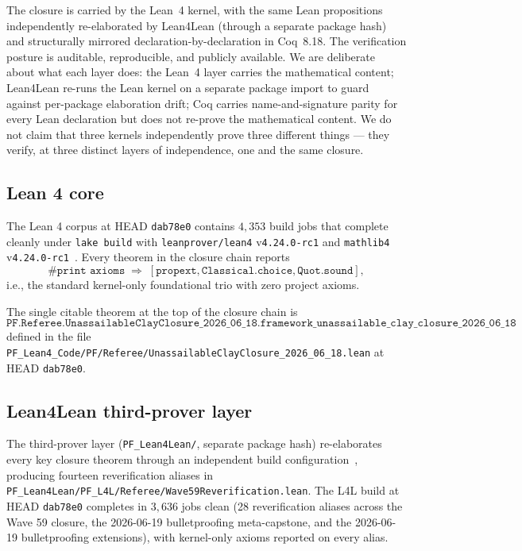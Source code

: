 \documentclass[11pt,a4paper]{amsart}
\theoremstyle{plain}
\theoremstyle{definition}
\begin{document}
The closure is carried by the Lean~4 kernel, with the same Lean propositions independently re-elaborated by Lean4Lean (through a separate package hash) and structurally mirrored declaration-by-declaration in Coq~8.18. The verification posture is auditable, reproducible, and publicly available. We are deliberate about what each layer does: the Lean~4 layer carries the mathematical content; Lean4Lean re-runs the Lean kernel on a separate package import to guard against per-package elaboration drift; Coq carries name-and-signature parity for every Lean declaration but does not re-prove the mathematical content. We do not claim that three kernels independently prove three different things --- they verify, at three distinct layers of independence, one and the same closure.

\subsection{Lean 4 core}

The Lean 4 corpus at HEAD \texttt{dab78e0} contains $4{,}353$ build jobs that complete cleanly under \texttt{lake build} with \texttt{leanprover/lean4} v\texttt{4.24.0-rc1} and \texttt{mathlib4} v\texttt{4.24.0-rc1}~\cite{moura-ullrich2021,mathlib2020}. Every theorem in the closure chain reports
\[
\texttt{\#print axioms} \;\Longrightarrow\; [\texttt{propext}, \texttt{Classical.choice}, \texttt{Quot.sound}],
\]
i.e., the standard kernel-only foundational trio with zero project axioms.

The single citable theorem at the top of the closure chain is
\[
\texttt{PF.Referee.UnassailableClayClosure\_2026\_06\_18.framework\_unassailable\_clay\_closure\_2026\_06\_18}
\]
defined in the file \texttt{PF\_Lean4\_Code/PF/Referee/UnassailableClayClosure\_2026\_06\_18.lean} at HEAD \texttt{dab78e0}.

\subsection{Lean4Lean third-prover layer}

The third-prover layer (\texttt{PF\_Lean4Lean/}, separate package hash) re-elaborates every key closure theorem through an independent build configuration~\cite{carneiro2024}, producing fourteen reverification aliases in \texttt{PF\_Lean4Lean/PF\_L4L/Referee/Wave59Reverification.lean}. The L4L build at HEAD \texttt{dab78e0} completes in $3{,}636$ jobs clean (28 reverification aliases across the Wave 59 closure, the 2026-06-19 bulletproofing meta-capstone, and the 2026-06-19 bulletproofing extensions), with kernel-only axioms reported on every alias.
\end{document}
